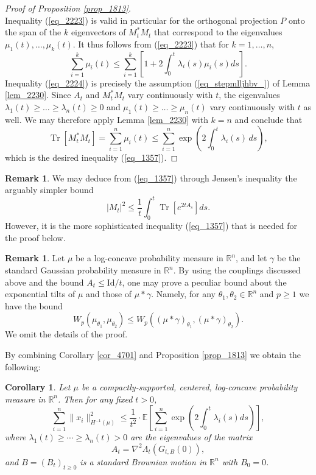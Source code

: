 \documentclass[12pt,a4paper]{article}
\newcommand{\Tr}{\mathop{\mathrm{Tr}}\nolimits}
\newcommand{\EE}{\mathbb{E}}
\newcommand{\RR}{\mathbb{R}}
\newcommand{\R}{\mathbb{R}}
\newcommand{\id}{\mathrm{Id}}
\newtheorem{corollary}[theorem]{Corollary}
\theoremstyle{definition}
\newtheorem{remark}[theorem]{Remark}
\begin{document}
\begin{proof}[Proof of Proposition \ref{prop_1813}]
\begin{equation}
\label{eq_2223}
\end{equation}
Inequality (\ref{eq_2223}) is valid in particular for the orthogonal projection $P$
onto the span of the $k$ eigenvectors of $M_t^* M_t$ that correspond to the eigenvalues $\mu_1(t),\ldots,\mu_k(t)$. It thus follows from (\ref{eq_2223}) that
for $k=1,\ldots,n$,
\begin{equation}
\sum_{i=1}^k \mu_i(t) \leq \sum_{i=1}^k \left[ 1 + 2 \int_0^t \lambda_i(s) \mu_i(s) ds \right].
\label{eq_2224}
\end{equation}
Inequality (\ref{eq_2224}) is precisely the assumption (\ref{eq_stepmlljhbv_})
of Lemma \ref{lem_2230}. Since $A_t$ and $M_t^* M_t$ vary continuously with $t$,
the eigenvalues $\lambda_1(t) \geq \ldots \geq \lambda_n(t) \geq 0$ and 
$\mu_1(t) \geq \ldots \geq \mu_n(t)$ vary continuously with $t$ as well.
We may therefore apply Lemma \ref{lem_2230} with $k =n$
and conclude that
$$ \Tr[M_t^* M_t] = \sum_{i=1}^n \mu_i (t) \leq \sum_{i=1}^n \exp \left( 2 \int_0^t \lambda_i (s) \, ds \right), $$
which is the desired inequality (\ref{eq_1357}).
\end{proof}

\begin{remark} We may deduce from (\ref{eq_1357}) through Jensen's inequality the arguably simpler bound
\[
|M_t|^2 \leq \frac{1}{t} \int_0^t \Tr \left[ e^{2 t A_s} \right] ds.
\]
However, it is the more sophisticated inequality (\ref{eq_1357}) that is needed for the proof below.
\end{remark}
%
\begin{remark} \label{rem_1156} Let $\mu$ be a log-concave probability measure in $\RR^n$, and
let $\gamma$ be the standard Gaussian probability
	measure in $\RR^n$. By using the couplings discussed above and the bound $A_t \leq \id / t$, one may prove a peculiar bound about the
	exponential tilts of $\mu$ and those of $\mu * \gamma$. Namely, for any $\theta_1 , \theta_2 \in \R^n$ and $p \geq 1$ we have the bound
$$
	W_p \left( \mu_{\theta_1}, \mu_{\theta_2} \right) \leq W_p \left( (\mu * \gamma)_{\theta_1}, (\mu* \gamma)_{\theta_2} \right) .
		$$
We omit the details of the proof.
\end{remark}
%
By combining  Corollary \ref{cor_4701} and
Proposition \ref{prop_1813} we  obtain the following:
%
\begin{corollary}\label{cor_311} Let $\mu$ be a compactly-supported, centered, log-concave probability measure in $\RR^n$.
Then for any fixed $t > 0$,
\begin{equation}  \sum_{i=1}^n \| x_i \|_{H^{-1}(\mu)}^2 \leq \frac{1}{t^2} \cdot \EE \left[  \sum_{i=1}^n  \exp \left( 2 \int_0^t \lambda_{i} (s) ds \right) \right], 
\label{eq_1933} \end{equation}
where $\lambda_{1} (t) \geq \dotsb \geq \lambda_n (t) >0$
are the eigenvalues of the matrix
\[
A_t = \nabla^2 \Lambda_t ( G_{t,B} (0) ) ,
\]
and $B = (B_t)_{t \geq 0}$ is a standard Brownian motion in $\RR^n$ with $B_0 = 0$.
\end{corollary}
\end{document}
